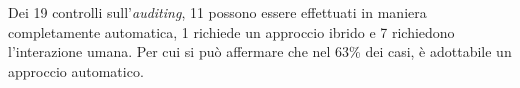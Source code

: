 \begin{center}
\end{center}
Dei 19 controlli sull'\textit{auditing}, 11 possono essere effettuati in maniera completamente automatica, 1 richiede un approccio ibrido e 7 richiedono l'interazione umana.
Per cui si può affermare che nel 63\% dei casi, è adottabile un approccio automatico.


